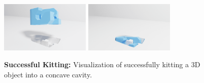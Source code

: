 \begin{figure}[t]
  \centering
  \vspace{8pt}
  \includegraphics[width=121pt,trim=440 0 440 0, clip]{figures/bar_clamp_impression_2.png}\hfill%
  \includegraphics[width=121pt,trim=440 0 440 0, clip]{figures/bar_clamp_impression_4.png}
  \caption{\textbf{Successful Kitting: }Visualization of successfully kitting a 3D object into a concave cavity.}
  \label{fig:mug-cavity-2}
\end{figure}